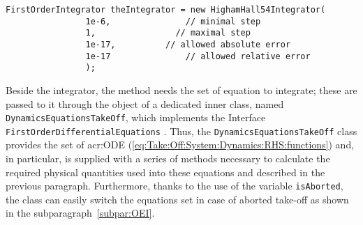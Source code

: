 \bigskip
\begin{lstlisting}[caption={HighamHall54Integrator class object creation}, captionpos=b, tabsize=2]
FirstOrderIntegrator theIntegrator = new HighamHall54Integrator(
				1e-6,				// minimal step 
				1,				  // maximal step 
				1e-17,			// allowed absolute error
				1e-17				// allowed relative error
				);
\end{lstlisting}
%
Beside the integrator, the method needs the set of equation to integrate; these are passed to it through the object of a dedicated inner class, named \lstinline[language=Java]!DynamicsEquationsTakeOff!, which implements the \gls{Interface} \lstinline[language=Java]!FirstOrderDifferentialEquations! \cite{apache:FirstOrderDifferentialEquations}. Thus, the \lstinline[language=Java]!DynamicsEquationsTakeOff! class provides the set of \gls{acr:ODE} (\ref{eq:Take:Off:System:Dynamics:RHS:functions}) and, in particular, is supplied with a series of methods necessary to calculate the required physical quantities used into these equations and described in the previous paragraph. Furthermore, thanks to the use of the variable \lstinline[language=Java]!isAborted!, the class can easily switch the equations set in case of aborted take-off as shown in the subparagraph~\ref{subpar:OEI}.

